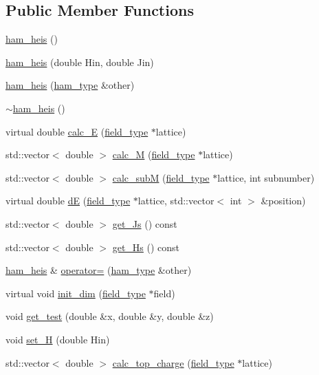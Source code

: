 \subsection*{Public Member Functions}
\begin{DoxyCompactItemize}
\item 
\hyperlink{classham__heis_a45354944ff0222eea8b2a48f3f51261b}{ham\+\_\+heis} ()
\item 
\hyperlink{classham__heis_af871854309ad6a2ec252e0af4c0d0220}{ham\+\_\+heis} (double Hin, double Jin)
\item 
\hyperlink{classham__heis_aa418d244b6fdd27e9b0c8b61d8928ee7}{ham\+\_\+heis} (\hyperlink{classham__type}{ham\+\_\+type} \&other)
\item 
\hyperlink{classham__heis_a71b4725414a6bc8f7d5ad46f86307abe}{$\sim$ham\+\_\+heis} ()
\item 
virtual double \hyperlink{classham__heis_a9356396de229b2a0142fa6505f0132c1}{calc\+\_\+E} (\hyperlink{classfield__type}{field\+\_\+type} $\ast$lattice)
\item 
std\+::vector$<$ double $>$ \hyperlink{classham__heis_ab10e4c9b74e7182751715c670cf3c44c}{calc\+\_\+M} (\hyperlink{classfield__type}{field\+\_\+type} $\ast$lattice)
\item 
std\+::vector$<$ double $>$ \hyperlink{classham__heis_a4713342c74601ac3246a34ebd429c07b}{calc\+\_\+subM} (\hyperlink{classfield__type}{field\+\_\+type} $\ast$lattice, int subnumber)
\item 
virtual double \hyperlink{classham__heis_a80b17aefe298faa50b5cecb1aa9da4ad}{dE} (\hyperlink{classfield__type}{field\+\_\+type} $\ast$lattice, std\+::vector$<$ int $>$ \&position)
\item 
std\+::vector$<$ double $>$ \hyperlink{classham__heis_a177ac16e9cc6a7b2455c0271394362af}{get\+\_\+\+Js} () const 
\item 
std\+::vector$<$ double $>$ \hyperlink{classham__heis_afbdbe29a893440db2ddab8fd41775e56}{get\+\_\+\+Hs} () const 
\item 
\hyperlink{classham__heis}{ham\+\_\+heis} \& \hyperlink{classham__heis_adc3feaa662064f07594bdbb83aef42cb}{operator=} (\hyperlink{classham__type}{ham\+\_\+type} \&other)
\item 
virtual void \hyperlink{classham__heis_a48cfb1cf4cc50765d408113878f44979}{init\+\_\+dim} (\hyperlink{classfield__type}{field\+\_\+type} $\ast$field)
\item 
void \hyperlink{classham__heis_a3c603d70b56a9df357d3c39212395422}{get\+\_\+test} (double \&x, double \&y, double \&z)
\item 
void \hyperlink{classham__heis_ab11ec994196743c909117b1231c6bfda}{set\+\_\+H} (double Hin)
\item 
std\+::vector$<$ double $>$ \hyperlink{classham__heis_a12fedc92d02868a2eacfe2e3eb2578cf}{calc\+\_\+top\+\_\+charge} (\hyperlink{classfield__type}{field\+\_\+type} $\ast$lattice)
\end{DoxyCompactItemize}
